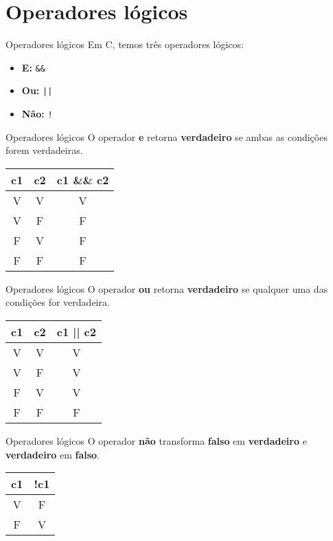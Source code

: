 \documentclass{beamer}
\begin{document}
\section{Operadores lógicos}
\begin{frame}{Operadores lógicos}
	Em C, temos três operadores lógicos:
	\begin{itemize}
		\item \textbf{E:} \texttt{\&\&}
		\item \textbf{Ou:} \texttt{||}
		\item \textbf{Não:} \texttt{!}
	\end{itemize}
\end{frame}
\begin{frame}{Operadores lógicos}
	O operador \textbf{e} retorna \textbf{verdadeiro} se \alert{ambas as condições forem verdadeiras}.
	\begin{table}[!b]
	{\carlitoTLF
		\begin{tabular}{ccc}
			\textbf{c1} & \textbf{c2} &  \textbf{c1 \&\& c2} \\
			\toprule
			V & V & V \\
			V & F & F \\
			F & V & F \\
			F & F & F \\
			\bottomrule
		\end{tabular}}
	\end{table}
\end{frame}
\begin{frame}{Operadores lógicos}
	O operador \textbf{ou} retorna \textbf{verdadeiro} se \alert{qualquer uma das condições for verdadeira}.
	\begin{table}[!b]
	{\carlitoTLF
		\begin{tabular}{ccc}
			\textbf{c1} & \textbf{c2} &  \textbf{c1 || c2} \\
			\toprule
			V & V & V \\
			V & F & V \\
			F & V & V \\
			F & F & F \\
			\bottomrule
		\end{tabular}}
	\end{table}
\end{frame}
\begin{frame}{Operadores lógicos}
	O operador \textbf{não} transforma \textbf{falso} em \textbf{verdadeiro} e \textbf{verdadeiro} em \textbf{falso}.
	\begin{table}[!b]
	{\carlitoTLF
		\begin{tabular}{cc}
			\textbf{c1} & \textbf{!c1} \\
			\toprule
			V & F \\
			F & V \\
			\bottomrule
		\end{tabular}}
	\end{table}
\end{frame}
\end{document}
